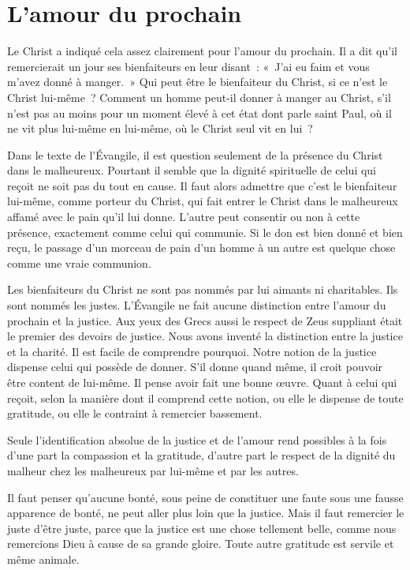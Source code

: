 \documentclass[french,twoside]{book} %
\begin{document}
\section[L'amour du prochain]{L'amour du prochain}
\noindent Le Christ a indiqué cela assez clairement pour l'amour du prochain. Il a dit qu'il remercierait un jour ses bienfaiteurs en leur disant : « J'ai eu faim et vous m'avez donné à manger. » Qui peut être le bienfaiteur du Christ, si ce n'est le Christ lui-même ? Comment un homme peut-il donner à manger au Christ, s'il n'est pas au moins pour un moment élevé à cet état dont parle saint Paul, où il ne vit plus lui-même en lui-même, où le Christ seul vit en lui ?\par
Dans le texte de l'Évangile, il est question seulement de la présence du Christ dans le malheureux. Pourtant il semble que la dignité spirituelle de celui qui reçoit ne soit pas du tout en cause. Il faut alors admettre que c'est le bienfaiteur lui-même, comme porteur du Christ, qui fait entrer le Christ dans le malheureux affamé avec le pain qu'il lui donne. L'autre peut consentir ou non à cette présence, exactement comme celui qui communie. Si le don est bien donné et bien reçu, le passage d'un morceau de pain d'un homme à un autre est quelque chose comme une vraie communion.\par
Les bienfaiteurs du Christ ne sont pas nommés par lui aimants ni charitables. Ils sont nommés les justes. L'Évangile ne fait aucune distinction entre l'amour du prochain et la justice. Aux yeux des Grecs aussi le respect de Zeus suppliant était le premier des devoirs de justice. Nous avons inventé la distinction entre la justice et la charité. Il est facile de comprendre pourquoi. Notre notion de la justice dispense celui qui possède de donner. S'il donne quand même, il croit pouvoir être content de lui-même. Il pense avoir fait une bonne œuvre. Quant à celui qui reçoit, selon la manière dont il comprend cette notion, ou elle le dispense de toute gratitude, ou elle le contraint à remercier bassement.\par
Seule l'identification absolue de la justice et de l'amour rend possibles à la fois d'une part la compassion et la gratitude, d'autre part le respect de la dignité du malheur chez les malheureux par lui-même et par les autres.\par
Il faut penser qu'aucune bonté, sous peine de constituer une faute sous une fausse apparence de bonté, ne peut aller plus loin que la justice. Mais il faut remercier le juste d'être juste, parce que la justice est une chose tellement belle, comme nous remercions Dieu à cause de sa grande gloire. Toute autre gratitude est servile et même animale.\par
\end{document}
